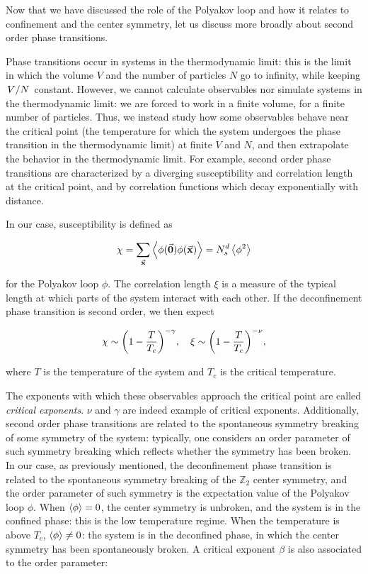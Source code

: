 \documentclass[reqno,12pt]{article}
\numberwithin{equation}{section}
\begin{document}
Now that we have discussed the role of the Polyakov loop and how it relates to confinement and the center symmetry, let us
discuss more broadly about second order phase transitions.

Phase transitions occur in systems in the thermodynamic limit: this is the limit in which the volume $V$ and
the number of particles $N$ go to infinity, while keeping $\flatfrac{V}{N}$ constant. However, we cannot calculate
observables nor simulate systems in the thermodynamic limit: we are forced to work in a finite volume, 
for a finite number of particles.
Thus, we instead study how some observables behave near the critical point (the temperature for which the system undergoes
the phase transition in the thermodynamic limit) at finite $V$ and $N$, and then extrapolate the behavior in the
thermodynamic limit. For example, second order phase transitions are characterized by a diverging susceptibility
and correlation length at the critical point, and by correlation functions which decay exponentially with distance. 

In our case, susceptibility is defined as

\begin{equation} \label{eq:susc_definition}
	\chi = \sum_{\va{x}} \expval{\phi(\va{0}) \phi(\va{x})} = N_s^d \expval{\phi^2}
\end{equation}

for the Polyakov loop $\phi$. The correlation length $\xi$ is a measure of the typical length at which parts of
the system interact with each other. If the deconfinement phase transition is second order, we then expect

\begin{equation}
	\chi \sim \qty(1 - \frac{T}{T_c})^{-\gamma} \qc \xi \sim \qty(1 - \frac{T}{T_c})^{-\nu},
\end{equation}

where $T$ is the temperature of the system and $T_c$ is the critical temperature.

The exponents with which these observables approach the critical point are called 
\textit{critical exponents}. $\nu$ and $\gamma$ are indeed example of critical exponents.
Additionally, second order phase transitions
are related to the spontaneous symmetry breaking of some symmetry of the system: typically, one considers an
order parameter of such symmetry breaking which reflects whether the symmetry has been broken. In our case,
as previously mentioned, the deconfinement
phase transition is related to the spontaneous symmetry breaking of the $\mathbb{Z}_2$ center symmetry, and the order 
parameter of such symmetry is the expectation value of the Polyakov loop $\phi$. When $\expval{\phi} = 0$, 
the center symmetry is unbroken, and the system is in the confined phase: this is the low temperature regime. When
the temperature is above $T_c$, $\expval{\phi} \ne 0$: the system is in the deconfined phase, in which the
center symmetry has been spontaneously broken. A critical exponent $\beta$ is also associated to the order parameter:
\end{document}
